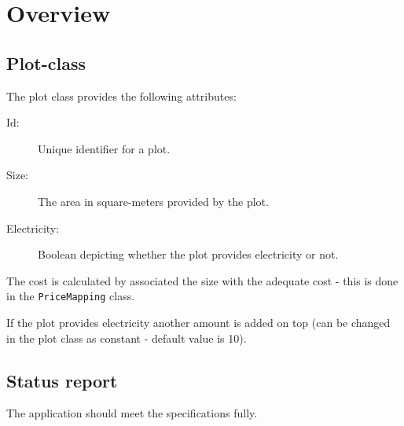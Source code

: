 \chapter{Overview}
\label{ch:report}

\section{Plot-class}

The plot class provides the following attributes:

\begin{description}
\item[Id:] Unique identifier for a plot.
\item[Size:] The area in square-meters provided by the plot.
\item[Electricity:] Boolean depicting whether the plot provides electricity or not.
\end{description}

The cost is calculated by associated the size with the adequate cost - this is done in the \texttt{PriceMapping} class.

If the plot provides electricity another amount is added on top (can be changed in the plot class as constant - default value is 10).

\section{Status report}

The application should meet the specifications fully.